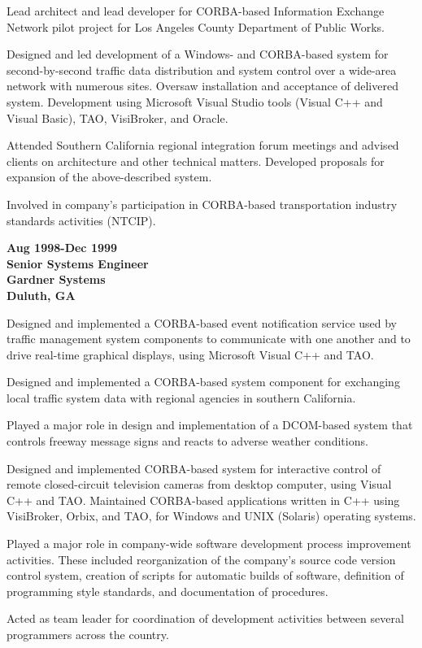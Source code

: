 Lead architect and lead developer for CORBA-based Information Exchange
Network pilot project for Los Angeles County Department of Public Works.

Designed and led development of a Windows- and CORBA-based system for
second-by-second traffic data distribution and system control over a
wide-area network with numerous sites. Oversaw installation and
acceptance of delivered system. Development using Microsoft Visual
Studio tools (Visual C++ and Visual Basic), TAO, VisiBroker, and Oracle.

Attended Southern California regional integration forum meetings and
advised clients on architecture and other technical matters. Developed
proposals for expansion of the above-described system.

Involved in company's participation in CORBA-based transportation
industry standards activities (NTCIP).

\textbf{Aug 1998-Dec 1999\\
Senior Systems Engineer\\
Gardner Systems\\
Duluth, GA}

Designed and implemented a CORBA-based event notification service used
by traffic management system components to communicate with one another
and to drive real-time graphical displays, using Microsoft Visual C++
and TAO.

Designed and implemented a CORBA-based system component for exchanging
local traffic system data with regional agencies in southern California.

Played a major role in design and implementation of a DCOM-based system
that controls freeway message signs and reacts to adverse weather
conditions.

Designed and implemented CORBA-based system for interactive control of
remote closed-circuit television cameras from desktop computer, using
Visual C++ and TAO. Maintained CORBA-based applications written in C++
using VisiBroker, Orbix, and TAO, for Windows and UNIX (Solaris)
operating systems.

Played a major role in company-wide software development process
improvement activities. These included reorganization of the company's
source code version control system, creation of scripts for automatic
builds of software, definition of programming style standards, and
documentation of procedures.

Acted as team leader for coordination of development activities between
several programmers across the country.

